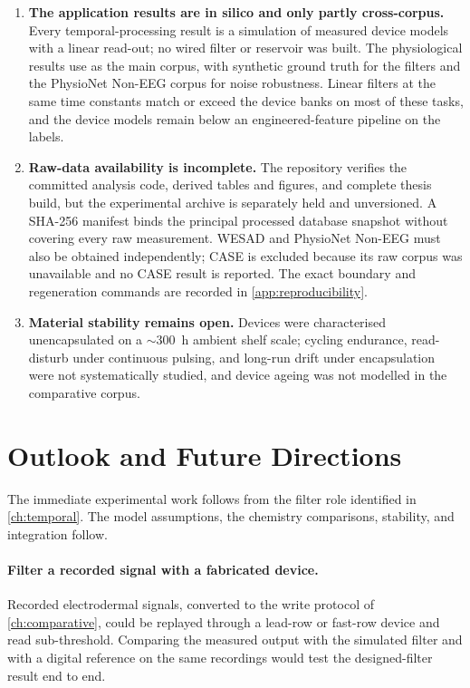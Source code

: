\documentclass[12pt, twoside]{report}
\begin{document}
\begin{enumerate}
  \item \textbf{The application results are in silico and only partly cross-corpus.} Every temporal-processing result is a simulation of measured device models with a linear read-out; no wired filter or reservoir was built. The physiological results use \WESAD{} as the main corpus, with synthetic ground truth for the filters and the PhysioNet Non-EEG corpus for noise robustness. Linear filters at the same time constants match or exceed the device banks on most of these tasks, and the device models remain below an engineered-feature pipeline on the \WESAD{} labels.

  \item \textbf{Raw-data availability is incomplete.} The repository verifies the committed analysis code, derived tables and figures, and complete thesis build, but the experimental archive is separately held and unversioned. A SHA-256 manifest binds the principal processed database snapshot without covering every raw measurement. WESAD and PhysioNet Non-EEG must also be obtained independently; CASE is excluded because its raw corpus was unavailable and no CASE result is reported. The exact boundary and regeneration commands are recorded in \cref{app:reproducibility}.

  \item \textbf{Material stability remains open.} Devices were characterised unencapsulated on a $\sim$\SI{300}{\hour} ambient shelf scale; cycling endurance, read-disturb under continuous pulsing, and long-run drift under encapsulation were not systematically studied, and device ageing was not modelled in the comparative corpus.
\end{enumerate}

\section{Outlook and Future Directions}\label{sec:concl_outlook}

The immediate experimental work follows from the filter role identified in \cref{ch:temporal}. The model assumptions, the chemistry comparisons, stability, and integration follow.

\paragraph{Filter a recorded signal with a fabricated device.} Recorded electrodermal signals, converted to the write protocol of \cref{ch:comparative}, could be replayed through a lead-row or fast-row device and read sub-threshold. Comparing the measured output with the simulated filter and with a digital reference on the same recordings would test the designed-filter result end to end.
\end{document}
